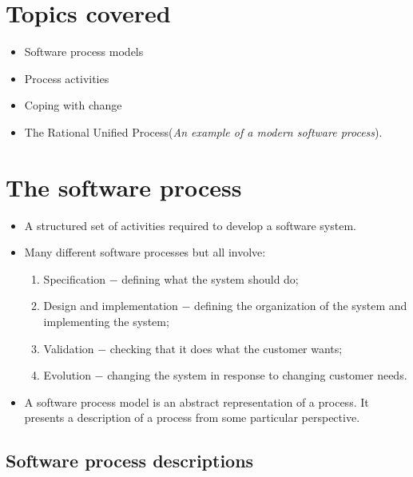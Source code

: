 \section{Topics covered}
\begin{itemize}
  \item Software process models
  \item Process activities
  \item Coping with change
  \item The Rational Unified Process(\textit{An example of a modern software process}).

\end{itemize}

\section{The software process}
\begin{itemize}
  \item A structured set of activities required to develop a software system.
  \item Many different software processes but all involve:
  \begin{enumerate}
    \item Specification $-$ defining what the system should do;
    \item Design and implementation $-$ defining the organization of the system and implementing the system;
    \item Validation $-$ checking that it does what the customer wants;
    \item Evolution $-$ changing the system in response to changing customer needs.
  \end{enumerate}

  \item A software process model is an abstract representation of a process. It presents a description of a process from some particular perspective.
\end{itemize}


\subsection{Software process descriptions}

